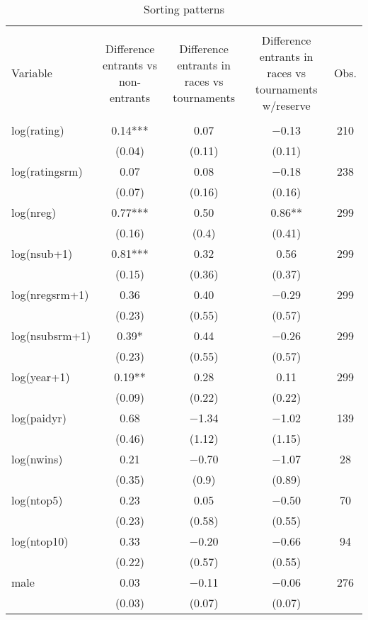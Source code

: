 \documentclass[10pt, titlepage]{article}
\begin{document}
\begin{table}
\centering
\caption{Sorting patterns}
\label{sorting}
\begin{tabular}{@{}lcccc}
  \\[-1.8ex]\hline\hline\\[-1.8ex]
Variable & \multicolumn{1}{L{2cm}}{Difference entrants vs non-entrants} & \multicolumn{1}{L{2cm}}{Difference entrants in races vs tournaments} & \multicolumn{1}{L{2cm}}{Difference entrants in races vs tournaments w/reserve} & Obs. \\ 
  \hline\\[-1.86ex]
log(rating) &  0.14*** &  0.07 &  $-$0.13 & 210 \\ 
   & (0.04) & (0.11) & (0.11) &  \\ 
  log(ratingsrm) &  0.07 &  0.08 &  $-$0.18 & 238 \\ 
   & (0.07) & (0.16) & (0.16) &  \\ 
  log(nreg) &  0.77*** &  0.50 &   0.86** & 299 \\ 
   & (0.16) & (0.4) & (0.41) &  \\ 
  log(nsub+1) &  0.81*** &  0.32 &   0.56 & 299 \\ 
   & (0.15) & (0.36) & (0.37) &  \\ 
  log(nregsrm+1) &  0.36 &  0.40 &  $-$0.29 & 299 \\ 
   & (0.23) & (0.55) & (0.57) &  \\ 
  log(nsubsrm+1) &  0.39* &  0.44 &  $-$0.26 & 299 \\ 
   & (0.23) & (0.55) & (0.57) &  \\ 
  log(year+1) &  0.19** &  0.28 &   0.11 & 299 \\ 
   & (0.09) & (0.22) & (0.22) &  \\ 
  log(paidyr) &  0.68 & $-$1.34 &  $-$1.02 & 139 \\ 
   & (0.46) & (1.12) & (1.15) &  \\ 
  log(nwins) &  0.21 & $-$0.70 &  $-$1.07 & 28 \\ 
   & (0.35) & (0.9) & (0.89) &  \\ 
  log(ntop5) &  0.23 &  0.05 &  $-$0.50 & 70 \\ 
   & (0.23) & (0.58) & (0.55) &  \\ 
  log(ntop10) &  0.33 & $-$0.20 &  $-$0.66 & 94 \\ 
   & (0.22) & (0.57) & (0.55) &  \\ 
  male &  0.03 & $-$0.11 &  $-$0.06 & 276 \\ 
   & (0.03) & (0.07) & (0.07) &  \\ 

\end{tabular}
\end{table}
\end{document}
